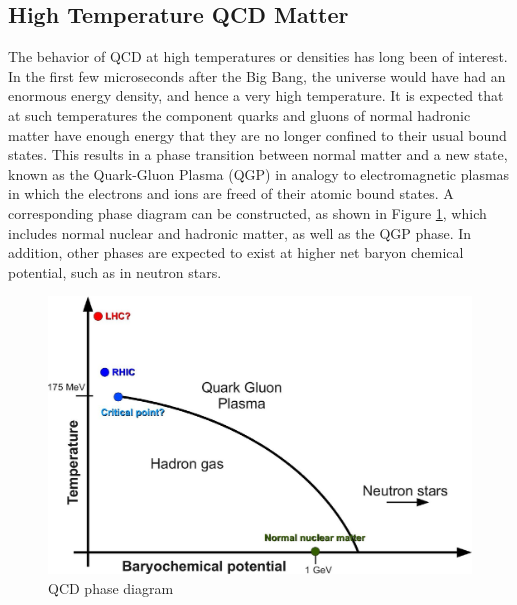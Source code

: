 \subsection{High Temperature QCD Matter}

The behavior of QCD at high temperatures or densities has long been of interest. In the first
few microseconds after the Big Bang, the universe would have had an enormous energy density, and
hence a very high temperature. It is expected that at such temperatures the component quarks
and gluons of normal hadronic matter have enough energy that they are no longer confined to their
usual bound states. This results in a phase transition between normal matter and a new state,
known as the Quark-Gluon Plasma (QGP) in analogy to electromagnetic plasmas in which the
electrons and ions are freed of their atomic bound states. A corresponding phase diagram can be
constructed, as shown in Figure \ref{fig:QCDPhaeDiagram}, which includes normal nuclear and hadronic matter, as well
as the QGP phase. In addition, other phases are expected to exist at higher net baryon chemical
potential, such as in neutron stars.


\begin{figure}
  \includegraphics[width=\hugefigwidth]{chap_SMAndQGP_figures/QCDphasediagram1}
  \caption[QCD Phase diagram]
  {QCD phase diagram}
  \label{fig:QCDPhaeDiagram}
\end{figure}


